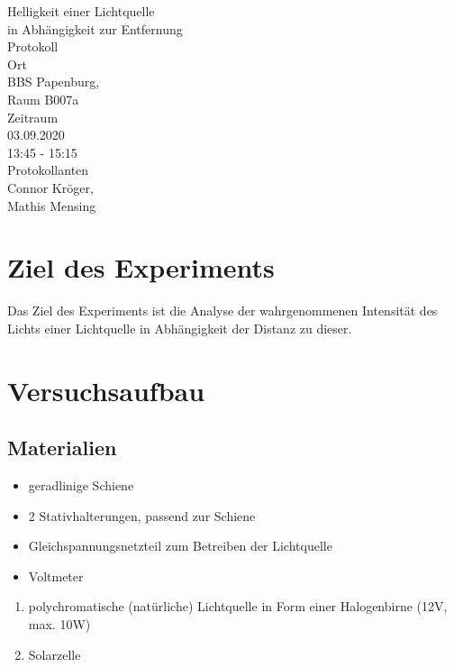 \documentclass[12pt, a4paper]{article}
\begin{document}
\begin{titlepage}
\begin{center}
    \LARGE{Helligkeit einer Lichtquelle\\in Abhängigkeit zur Entfernung} \\
    \large{Protokoll} \\
    \vspace{10mm}
    \small{Ort} \\
    \Large{ BBS Papenburg,\\ 
            Raum B007a} \\
    \vspace{10mm}
    \small{Zeitraum} \\
    \Large{ 03.09.2020 \\
            13:45 - 15:15} \\
    \vspace{15mm}
    \small{Protokollanten} \\
    \Large{ Connor Kröger,\\
            Mathis Mensing}
\end{center}

\thispagestyle{empty}
\end{titlepage}

\tableofcontents
\newpage

\section{Ziel des Experiments}
Das Ziel des Experiments ist die Analyse der wahrgenommenen Intensität des Lichts einer Lichtquelle in Abhängigkeit der Distanz zu dieser.

\section{Versuchsaufbau}
\subsection{Materialien}

\begin{itemize}
    \item geradlinige Schiene
    \item 2 Stativhalterungen, passend zur Schiene
    \item Gleichspannungsnetzteil zum Betreiben der Lichtquelle
    \item Voltmeter
\end{itemize}
\begin{enumerate}
    \item polychromatische (nat\"urliche) Lichtquelle in Form einer Halogenbirne (12V, max. 10W)
    \item Solarzelle
\end{enumerate}
\end{document}
